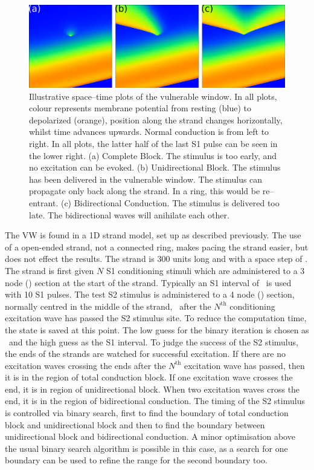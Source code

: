\begin{figure}
\centering
\includegraphics{figures/toolkit/illustrations/vw}
\caption[Illustration of VW cases]{
\label{fig:toolkit:illus:vw}
Illustrative space--time plots of the vulnerable window.
In all plots, colour represents membrane potential from resting (blue) to
depolarized (orange), position along the strand changes horizontally, whilst
time advances upwards.
Normal conduction is from left to right.
In all plots, the latter half of the last S1 pulse can be seen in the lower
right.
(a) Complete Block.  The stimulus is too early, and no excitation can be evoked.
(b) Unidirectional Block.
The stimulus has been delivered in the vulnerable window.
The stimulus can propagate only back along the strand.
In a ring, this would be re--entrant.
(c) Bidirectional Conduction.
The stimulus is delivered too late.
The bidirectional waves will anihilate each other.
}
\end{figure}


The VW is found in a 1D strand model, set up as described previously.
The use of a open-ended strand, not a connected ring, makes pacing the strand
easier, but does not effect the results.
The strand is 300 units long and with a space step of .
The strand is first given $N$ S1 conditioning stimuli which are administered to a
3 node () section at the start of the strand.
Typically an S1 interval of \ is used with 10 S1 pulses.
The test S2 stimulus is administered to a 4 node () section, normally
centred in the middle of the strand, \ after the $N^{\text{th}}$
conditioning excitation wave has passed the S2 stimulus site.
To reduce the computation time, the state is saved at this point.
The low guess for the binary iteration is chosen as \ and the high guess
as the S1 interval.
To judge the success of the S2 stimulus, the ends of the strands are watched for
successful excitation.
If there are no excitation waves crossing the ends after the $N^{\text{th}}$
excitation wave has passed, then it is in the region of total conduction block.
If one excitation wave crosses the end, it is in region of unidirectional block.
When two excitation waves cross the end, it is in the region of bidirectional
conduction.
The timing of the S2 stimulus is controlled via binary search, first to find the
boundary of total conduction block and unidirectional block and then to find the
boundary between unidirectional block and bidirectional conduction.
A minor optimisation above the usual binary search algorithm is possible in this
case, as a search for one boundary can be used to refine the range for the
second boundary too.

